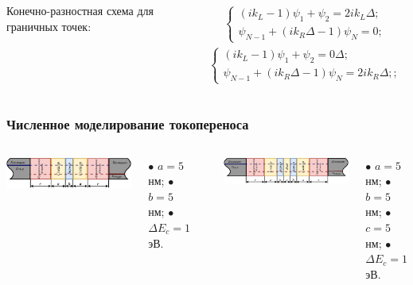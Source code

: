 \documentclass[10pt,pdf,hyperref={unicode},aspectratio={169}]{beamer}
\begin{document}
\begin{frame}
\begin{columns}
{\color{red}Конечно-разностная схема для граничных точек:}
\begin{columns}
	\footnotesize
	\begin{gather*}
		\begin{cases}
			(ik_{L}-1)\psi_{1} + \psi_{2} = 2ik_{L}\Delta;\\
			\psi_{N-1} + (ik_{R}\Delta - 1)\psi_{N} = 0;
		\end{cases}
	\end{gather*}
	\footnotesize
	\begin{gather*}
		\begin{cases}
			(ik_{L}-1)\psi_{1} + \psi_{2} = 0\Delta;\\
			\psi_{N-1} + (ik_{R}\Delta - 1)\psi_{N} = 2ik_{R}\Delta;;
		\end{cases}
	\end{gather*}
\end{columns}
\end{columns}
\end{frame}

\begin{frame}
	\frametitle{Численное моделирование токопереноса}
	\begin{columns}
	   	\includegraphics[width=\linewidth]{assets/BHS}

		{\scriptsize $\bullet$ $a = 5$ нм; $\bullet$ $b = 5$ нм; $\bullet$ $\Delta E_{c} = 1$эВ.}
		\rule[1mm]{0.2ex}{70mm}
	   	\includegraphics[width=\linewidth]{assets/RTHS}

		{\scriptsize $\bullet$ $a = 5$ нм; $\bullet$ $b = 5$ нм; $\bullet$ $c = 5$ нм; $\bullet$ $\Delta E_{c} = 1$эВ.}
	\end{columns}
\end{frame}
\end{document}
